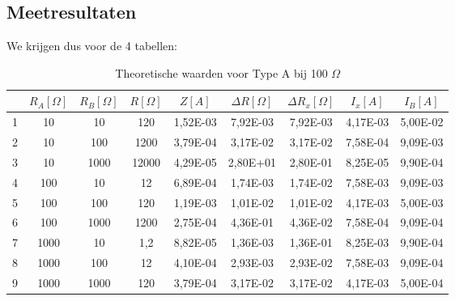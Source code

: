 \subsection{Meetresultaten}
We krijgen dus voor de 4 tabellen:
\begin{table}[H]
    \centering
    \label{tab:TA100}
    \caption{Theoretische waarden voor Type A bij 100 $\Omega$}
    \begin{tabular}{| c | c | c | c | c | c | c | c | c |}
        \hline
                & $R_A [\Omega]$    & $R_B [\Omega]$    & $R [\Omega]$  & $Z [A]$   & $\Delta R [\Omega]$   & $\Delta R_x [\Omega]$ & $I_x [A]$                 & $I_B [A]$             \\ \hline
        1       & 10                & 10                & 120           & 1,52E-03  & 7,92E-03              & 7,92E-03              & 4,17E-03                  & 5,00E-02 \\ \hline
        2       & 10                & 100               & 1200          & 3,79E-04  & 3,17E-02              & 3,17E-02              & 7,58E-04                  & 9,09E-03  \\ \hline   
        3       & 10                & 1000              & 12000         & 4,29E-05  & 2,80E+01              & 2,80E-01              & 8,25E-05                  & 9,90E-04  \\ \hline
        4       & 100               & 10                & 12            & 6,89E-04  & 1,74E-03              & 1,74E-02              & 7,58E-03                  & 9,09E-03  \\ \hline
        5	& 100	   &100	&120	&1,19E-03	&1,01E-02	&1,01E-02	&4,17E-03	&5,00E-03 \\ \hline
        6	&100	&1000	&1200	&2,75E-04	&4,36E-01	&4,36E-02	&7,58E-04	&9,09E-04 \\ \hline
        7	&1000	&10	&1,2	&8,82E-05	&1,36E-03	&1,36E-01	&8,25E-03	&9,90E-04 \\ \hline 
        8	&1000	&100	&12	&4,10E-04	&2,93E-03	&2,93E-02	&7,58E-03	&9,09E-04 \\ \hline
        9	&1000	&1000	&120	&3,79E-04	&3,17E-02	&3,17E-02	&4,17E-03	&5,00E-04 \\ \hline
    \end{tabular}
\end{table}
